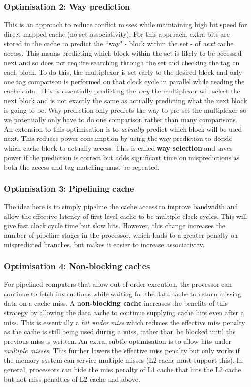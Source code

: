 \documentclass[11pt]{article}
\begin{document}
\subsubsection{Optimisation 2: Way prediction}
This is an approach to reduce conflict misses while maintaining high hit speed for direct-mapped cache (no set associativity). For this approach, extra bits are stored in the cache to predict the ``way" - block within the set - of \textit{next} cache access. This means predicting which block within the set is likely to be accessed next and so does not require searching through the set and checking the tag on each block. To do this, the multiplexor is set early to the desired block and only one tag comparison is performed on that clock cycle in parallel while reading the cache data. This is essentially predicting the \textit{way} the multiplexor will select the next block and is not exactly the same as actually predicting what the next block is going to be. Way prediction only predicts the way to pre-set the multiplexor so we potentially only have to do one comparison rather than many comparisons.
\n
An extension to this optimisation is to \textit{actually} predict which block will be used next. This reduces power consumption by using the way prediction to decide which cache block to actually access. This is called \textbf{way selection} and saves power if the prediction is correct but adds significant time on mispredictions as both the access and tag matching must be repeated.

\subsubsection{Optimisation 3: Pipelining cache}
The idea here is to simply pipeline the cache access to improve bandwidth and allow the effective latency of first-level cache to be multiple clock cycles. This will give fast clock cycle time but slow hits. However, this change increases the number of pipeline stages in the processor, which leads to a greater penalty on mispredicted branches, but makes it easier to increase associativity. 

\subsubsection{Optimisation 4: Non-blocking caches}
For pipelined computers that allow out-of-order execution, the processor can continue to fetch instructions while waiting for the data cache to return missing data on a cache miss. A \textbf{non-blocking cache} increases the benefits of this strategy by allowing the data cache to continue supplying cache hits even after a miss. This is essentially a \textit{hit under miss} which reduces the effective miss penalty as the cache is still being used during a miss, rather than be blocked until the previous miss is written. 
\n
An extra, subtle optimisation is to allow hits under \textit{multiple misses}. This further lowers the effective miss penalty but only works if the memory system can service multiple misses (L2 cache must support this).
\n
In general, processors can hide the miss penalty of L1 cache that hits the L2 cache but not miss penalties of L2 cache and above. 
\end{document}
